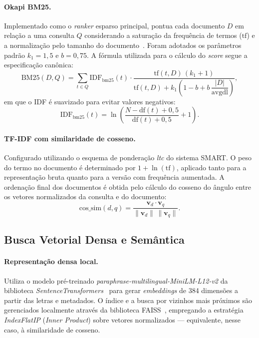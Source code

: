 \documentclass[12pt]{article}
\begin{document}
\paragraph{Okapi BM25.} Implementado como o \textit{ranker} esparso principal,
pontua cada documento $D$ em relação a uma consulta $Q$ considerando a saturação
da frequência de termos ($\text{tf}$) e a normalização pelo tamanho do
documento~\cite{robertson1994okapi,robertson2009probabilistic}. Foram adotados
os parâmetros padrão $k_1 = 1{,}5$ e $b = 0{,}75$. A fórmula utilizada para o
cálculo do \textit{score} segue a especificação canônica:
%
\begin{equation}
  \text{BM25}(D,Q)
    = \sum_{t \in Q} \text{IDF}_{\text{bm25}}(t) \cdot
      \frac{\text{tf}(t,D)\,(k_1 + 1)}
           {\text{tf}(t,D) + k_1\!\left(1 - b + b\,\dfrac{|D|}{\text{avgdl}}\right)},
\end{equation}
%
em que o IDF é suavizado para evitar valores negativos:
%
\begin{equation}
  \text{IDF}_{\text{bm25}}(t)
    = \ln\!\left(\frac{N - \text{df}(t) + 0{,}5}{\text{df}(t) + 0{,}5} + 1\right).
\end{equation}

\paragraph{TF-IDF com similaridade de cosseno.} Configurado utilizando o esquema
de ponderação \textit{ltc} do sistema SMART. O peso do
termo no documento é determinado por $1 + \ln(\text{tf})$, aplicado tanto para a
representação bruta quanto para a versão com frequência aumentada. A ordenação
final dos documentos é obtida pelo cálculo do cosseno do ângulo entre os vetores
normalizados da consulta e do documento:
%
\begin{equation}
  \text{cos\_sim}(d,q)
    = \frac{\mathbf{v}_d \cdot \mathbf{v}_q}
           {\lVert \mathbf{v}_d \rVert \, \lVert \mathbf{v}_q \rVert}.
\end{equation}

\subsection{Busca Vetorial Densa e Semântica}

\paragraph{Representação densa local.} Utiliza o modelo pré-treinado
\textit{paraphrase-multilingual-MiniLM-L12-v2} da biblioteca
\textit{Sentence\-Transformers}~\cite{reimers2019sentence} para gerar
\textit{embeddings} de 384 dimensões a partir das letras e metadados. O índice e
a busca por vizinhos mais próximos são gerenciados localmente através da
biblioteca FAISS~\cite{johnson2021billion}, empregando a estratégia
\textit{IndexFlatIP} (\textit{Inner Product}) sobre vetores normalizados ---
equivalente, nesse caso, à similaridade de cosseno.
\end{document}
